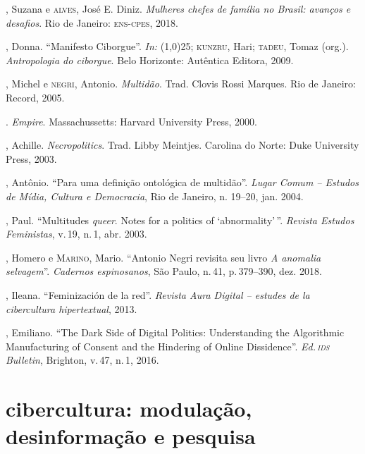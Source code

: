 \begin{bibliohedra}
, Suzana e \textsc{alves}, José E. Diniz. \textit{Mulheres chefes de
família no Brasil: avanços e desafios}. Rio de Janeiro: \textsc{ens-cpes}, 2018.

, Donna. ``Manifesto Ciborgue''. \textit{In:} \line(1,0){25}; \textsc{kunzru}, Hari; \textsc{tadeu}, Tomaz (org.). \textit{Antropologia do ciborgue}. Belo Horizonte: Autêntica Editora, 2009.

, Michel e \textsc{negri}, Antonio. \textit{Multidão}. Trad. Clovis Rossi
Marques. Rio de Janeiro: Record, 2005.

\titidem. \textit{Empire}. Massachussetts: Harvard University Press, 2000.

, Achille. \textit{Necropolitics}. Trad. Libby Meintjes. Carolina do Norte: Duke
University Press, 2003. 

, Antônio. ``Para uma definição ontológica de multidão''.
\textit{Lugar Comum -- Estudos de Mídia, Cultura e Democracia}, Rio de Janeiro, n. 19--20,
jan. 2004.

, Paul. ``Multitudes \textit{queer}. Notes for a politics of
`abnormality'\,''. \textit{Revista Estudos Feministas}, v.\,19, n.\,1, abr. 2003.

, Homero e \textsc{Marino}, Mario. ``Antonio Negri revisita seu livro \textit{A anomalia selvagem}''. \textit{Cadernos espinosanos}, São Paulo, n.\,41, p.\,379--390, dez. 2018.

, Ileana. ``Feminización de la red''. \textit{Revista Aura
Digital -- estudes de la cibercultura hipertextual}, 2013.

, Emiliano. ``The Dark Side of Digital Politics:
Understanding the Algorithmic Manufacturing of Consent and the Hindering
of Online Dissidence''. \textit{Ed.\,\textsc{ids} Bulletin}, Brighton, v.\,47, n.\,1, 2016.
\end{bibliohedra}

\part{cibercultura: modulação, desinformação e pesquisa}


\begin{flushright}
\end{flushright}

